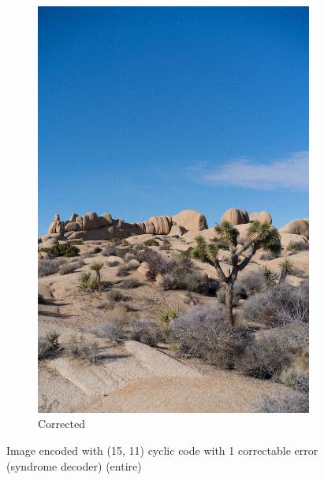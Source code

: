 \documentclass{article}
\begin{document}
\begin{figure}[htb]
\begin{subfigure}[b]{0.32\textwidth}
        \includegraphics[width=\textwidth]{../Result/Cyclic/15-11/cyclic-bsc-output-syndrome-corrected.png}
        \caption{Corrected}
        \label{fig:image-cyclic-15-11-syndrome-corrected}
    \end{subfigure}
       \caption{Image encoded with (15, 11) cyclic code with 1 correctable error (syndrome decoder) (entire)}
       \label{fig:image-cyclic-15-11-syndrome}
\end{figure}
\end{document}
